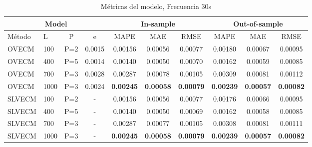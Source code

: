 \begin{table}[ht!]
\caption{Métricas del modelo, Frecuencia 30s}
\label{tab:mapes_30s}
\begin{center}
\begin{adjustbox}{max width=\textwidth}
\begin{tabular}{|l|l|c|c|c|c|c|c|c|c|}
\hline
\multicolumn{4}{|c|}{Model} & \multicolumn{3}{|c|}{In-sample} &
\multicolumn{3}{|c|}{Out-of-sample} \\ 
\hline
\hline
Método & L & P & e &
MAPE & MAE& RMSE&
MAPE & MAE& RMSE \\
\hline
 OVECM  &   100  &  P=2 &  0.0015  &  0.00156  &  0.00056  &  0.00077  &  0.00180  &  0.00067  &  0.00095 \\
 OVECM  &   400  &  P=5 &  0.0014  &  0.00140  &  0.00050  &  0.00070  &  0.00162  &  0.00059  &  0.00085 \\
 OVECM  &   700  &  P=3 &  0.0028  &  0.00287  &  0.00078  &  0.00105  &  0.00309  &  0.00081  &  0.00112 \\
 OVECM  &   1000 &  P=3 &  0.0024  &  \textbf{0.00245}  &  \textbf{0.00058}  &  \textbf{0.00079}  &  \textbf{0.00239}
   &  \textbf{0.00057}  &  \textbf{0.00082} \\
\hline
 SLVECM  &   100 &  P=2& -  &  0.00156  &  0.00056  &  0.00077  &  0.00176  &  0.00066  &  0.00095 \\
 SLVECM  &   400 &  P=5& -  &  0.00140  &  0.00050  &  0.00069  &  0.00162  &  0.00058  &  0.00085 \\
 SLVECM  &   700 &  P=3& -  &  0.00287  &  0.00077  &  0.00105  &  0.00308  &  0.00081  &  0.00111 \\
 SLVECM  &   1000&  P=3& -  &  \textbf{0.00245}  &  \textbf{0.00058}  &  \textbf{0.00079}  &  
  \textbf{0.00239}  &  \textbf{0.00057}  &  \textbf{0.00082} \\
\hline
\end{tabular}
\end{adjustbox}
\end{center}
\end{table}

